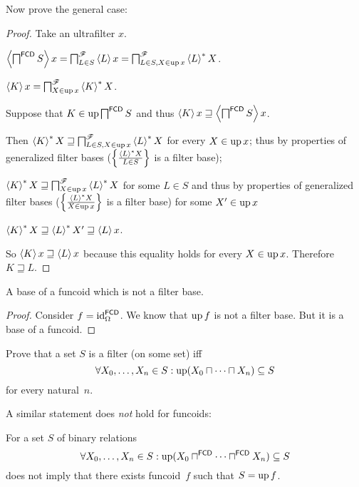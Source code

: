 Now prove the general case:

\begin{proof}
  Take an ultrafilter $x$.
  
  $\left\langle \bigsqcap^{\mathsf{FCD}} S\right\rangle x =
  \bigsqcap^{\mathscr{F}}_{L \in S} \left\langle L\right\rangle x =
  \bigsqcap^{\mathscr{F}}_{L \in S, X \in \operatorname{up} x} \left\langle L\right\rangle ^{\ast} X$.
  
  $\left\langle K\right\rangle x = \bigsqcap^{\mathscr{F}}_{X \in \operatorname{up} x} \left\langle K\right\rangle ^{\ast}X$.
  
  Suppose that $K \in \operatorname{up} \bigsqcap^{\mathsf{FCD}} S$ and thus
  $\left\langle K\right\rangle x \sqsupseteq \left\langle 
  \bigsqcap^{\mathsf{FCD}} S \right\rangle x$.
  
  Then
  $\left\langle K\right\rangle ^{\ast} X \sqsupseteq \bigsqcap^{\mathscr{F}}_{L \in S, X
  \in \operatorname{up} x} \left\langle L\right\rangle ^{\ast} X$ for every $X \in \operatorname{up} x$;
  thus by properties of generalized filter bases ($\left\{ \frac{ \left\langle L\right\rangle ^{\ast}X
  }{ L \in S }\right\}$ is a filter base);
  
  $\left\langle K\right\rangle ^{\ast} X \sqsupseteq \bigsqcap^{\mathscr{F}}_{X \in
  \operatorname{up} x} \left\langle L\right\rangle ^{\ast} X$ for some $L \in S$ and thus
  by properties of generalized filter bases ($\left\{ \frac{ \left\langle L\right\rangle ^{\ast}
  X }{ X \in \operatorname{up} x }\right\}$ is a filter base) for some $X' \in \operatorname{up} x$
  
  $\left\langle K\right\rangle ^{\ast} X \sqsupseteq \left\langle L\right\rangle ^{\ast} X'
  \sqsupseteq \left\langle L\right\rangle x$.
  
  So $\left\langle K\right\rangle x \sqsupseteq \left\langle L\right\rangle x$ because this
  equality holds for every $X \in \operatorname{up} x$. Therefore $K \sqsupseteq L$.
\end{proof}

\begin{example}
A base of a funcoid which is not a filter base.
\end{example}

\begin{proof}
Consider $f=\operatorname{id}^{\mathsf{FCD}}_{\Omega}$. We know that $\operatorname{up} f$ is not a
filter base. But it is a base of a funcoid.
\end{proof}

\begin{xca}
Prove that a set $S$ is a filter (on some set) iff
\[ \forall X_0,\dots,X_n\in S:\operatorname{up}(X_0\sqcap\dots\sqcap X_n)\subseteq S \]
for every natural~$n$.
\end{xca}

A similar statement does \emph{not} hold for funcoids:

\begin{example}
For a set $S$ of binary relations
\[ \forall X_0,\dots,X_n\in S:\operatorname{up}(X_0\sqcap^{\mathsf{FCD}}\dots\sqcap^{\mathsf{FCD}} X_n)\subseteq S \]
does not imply that there exists funcoid~$f$ such that $S=\operatorname{up} f$.
\end{example}

